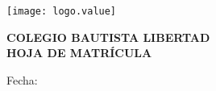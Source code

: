 \documentclass[12pt]{article}
\begin{document}
    \begin{minipage}[c][2.5cm]{0.2\textwidth}
        \texttt{[image: logo.value]}
    \end{minipage}
    \begin{minipage}[c][2.5cm]{0.6\textwidth}
        \begin{center}
            \textbf{\large COLEGIO BAUTISTA LIBERTAD\\HOJA DE MATRÍCULA}
        \end{center}
    \end{minipage}

    \hfill Fecha: \enrollDate
\end{document}
